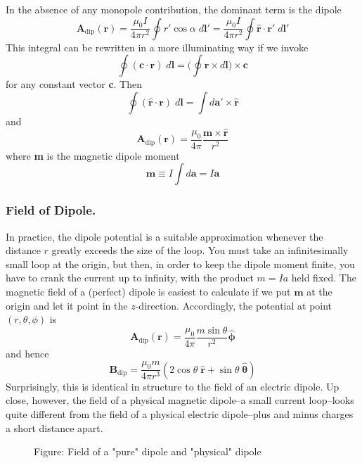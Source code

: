\documentclass[../../../main.tex]{subfiles}
\begin{document}
\begin{figure}
    \centering
\end{figure}

In the absence of any monopole contribution, the dominant term is the dipole
\begin{equation*}
    \mathbf{A}_\text{dip}(\mathbf{r})=\frac{\mu_0I}{4\pi r^2}\oint r' \cos \alpha\;d\mathbf{l}'= \frac{\mu_0I}{4\pi r^2} \oint \mathbf{\hat{r}}\cdot\mathbf{r'}\;d\mathbf{l}'
\end{equation*}
This integral can be rewritten in a more illuminating way if we invoke
\begin{equation*}
    \oint  (\mathbf{c} \cdot \mathbf{r}) \;d\mathbf{l} =\biggl(\oint  \mathbf{r}\times d\mathbf{l }\biggr) \times \mathbf{c}
\end{equation*}
for any constant vector \textbf{c}. Then
\begin{equation*}
    \oint  (\mathbf{\hat{r}} \cdot \mathbf{r}) \;d\mathbf{l} = \int d\mathbf{a}'\times\mathbf{\hat{r}}
\end{equation*}
and
\begin{equation*}
    \mathbf{A}_\text{dip}(\mathbf{r})=\frac{\mu_0 }{4\pi  }\frac{\mathbf{m}\times \mathbf{\hat{r}}}{r^2}
\end{equation*}
where \textbf{m} is the magnetic dipole moment
\begin{equation*}
    \mathbf{m}\equiv I\int d\mathbf{a}=I\mathbf{a}
\end{equation*}

\subsubsection{Field of Dipole.} In practice, the dipole potential is a suitable approximation whenever
the distance $r$ greatly exceeds the size of the loop. You must take an infinitesimally small loop at the origin, but then, in order to keep the dipole moment finite, you have to crank the current up to infinity, with the product $m = I a$ held fixed. The magnetic field of a (perfect) dipole is easiest to calculate if we put $\mathbf{m}$ at the origin and let it point in the $z$-direction. Accordingly, the potential at point $(r, \theta, \phi)$ is
\begin{equation*}
    \mathbf{A}_\text{dip}(\mathbf{r})=\frac{\mu_0 }{4\pi  }\frac{m\sin\theta}{r^2}\boldsymbol{\hat{\phi}}
\end{equation*}
and hence
\begin{equation*}
    \mathbf{B}_\text{dip}=\frac{\mu_0 m}{4\pi  r^3}(2\cos \theta \;\mathbf{\hat{r}}+ \sin\theta\;\boldsymbol{\hat{\theta}})
\end{equation*}
Surprisingly, this is identical in structure to the field of an electric dipole. Up close, however, the field of a physical magnetic dipole--a small current loop--looks quite different from the field of a physical electric
dipole--plus and minus charges a short distance apart.
\begin{figure}[ht]
    \centering
    \caption*{Figure: Field of a "pure" dipole and "physical" dipole}
\end{figure}
\end{document}
